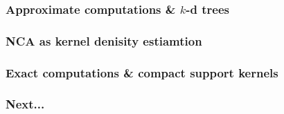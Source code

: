 \documentclass{beamer}
\begin{document}
  \begin{frame}
  	\frametitle{Approximate computations \& $k$-d trees}
  \end{frame}
  
  \begin{frame}
  	\frametitle{NCA as kernel denisity estiamtion}
  \end{frame}
  
  \begin{frame}
	\frametitle{Exact computations \& compact support kernels}
  \end{frame}
  
  \begin{frame}
	  \frametitle{Next...}
  \end{frame}
  
\end{document}

